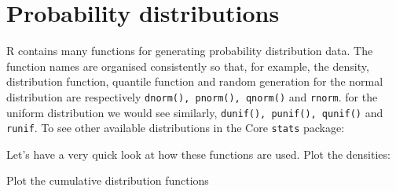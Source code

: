 \documentclass[titlepage]{book}\usepackage{knitr}
\begin{document}
\section{Probability distributions}
R contains many functions for generating probability distribution data. The function names are organised consistently so that, for example, the density, distribution function, quantile function and random generation for the normal distribution are respectively \texttt{dnorm(), pnorm(), qnorm()} and \texttt{rnorm}. for the uniform distribution we would see similarly, \texttt{dunif(), punif(), qunif()} and \texttt{runif}. To see other available distributions in the Core \texttt{stats} package:

\begin{knitrout}
\color{fgcolor}\begin{kframe}
\begin{alltt}
\end{alltt}
\end{kframe}
\end{knitrout}

Let's have a very quick look at how these functions are used.
Plot the densities:
\begin{knitrout}
\color{fgcolor}\begin{kframe}
\begin{alltt}
 \hlkwb{<-} \hlstd{(}\hlstd{=} \hlopt{-}\hlstd{,}  \hlstd{=} \hlstd{,}  \hlstd{=} \hlstd{)}
 \hlkwb{<-} 
 \hlkwb{<-} \hlstd{(}\hlopt{-}\hlstd{,}\hlstd{,}\hlstd{)}
 \hlkwb{<-} \hlopt{-}\hlstd{,}\hlstd{)}
  \hlstd{=} \hlstd{,}  \hlstd{=} \hlstd{)}
  \hlstd{=} \hlstd{)}
\end{alltt}
\end{kframe}
\end{knitrout}

Plot the cumulative distribution functions
\end{document}
